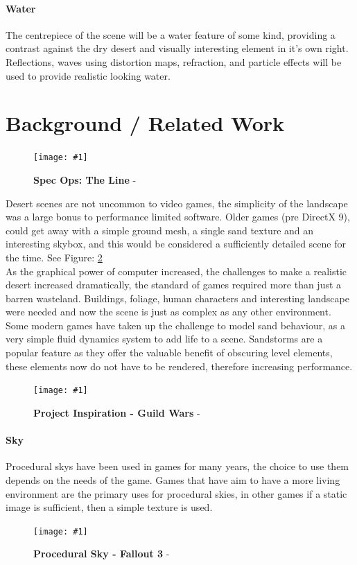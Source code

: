 \documentclass[conference]{acmsiggraph}
\newcommand{\figuremacroW}[4]{
	\begin{figure}[h] %
		\centering
		\texttt{[image: \#1]}
		\caption[#2]{\textbf{#2} - #3}
		\label{fig:#1}
	\end{figure}
}
\begin{document}
\paragraph{Water}
The centrepiece of the scene will be a water feature of some kind, providing a contrast against the dry desert and visually interesting element in it's own right. Reflections, waves using distortion maps, refraction, and particle effects will be used to provide realistic looking water. 

\section{Background / Related Work}
\figuremacroW
{specops}
{Spec Ops: The Line}
{\protect\cite{spec}}
{1.0}
Desert scenes are not uncommon to video games, the  simplicity of the landscape was a large bonus to performance limited software.
Older games (pre DirectX 9), could get away with a simple ground mesh, a single sand texture and an interesting skybox, and this would be considered a sufficiently detailed scene for the time. See Figure: \ref{fig:GuildWars}
\\
As the graphical power of computer increased, the challenges to make a realistic desert increased dramatically, the standard of games required more than just a barren wasteland. Buildings, foliage, human characters and interesting landscape were needed and now the scene is just as complex as any other environment.
Some modern games have taken up the challenge to model sand behaviour, as a very simple fluid dynamics system to add life to a scene. Sandstorms are a popular feature as they offer the valuable benefit of obscuring level elements, these elements now do not have to be rendered, therefore increasing performance.

\figuremacroW
{GuildWars}
{Project Inspiration - Guild Wars}
{\protect\cite{GuildWars}}
{1.0}

\paragraph{Sky}
Procedural skys have been used in games for many years, the choice to use them depends on the needs of the game.  Games that have aim to have a more living environment are the primary uses for procedural skies, in other games if a static image is sufficient, then a simple texture is used.
 
\figuremacroW
{fallout3}
{Procedural Sky - Fallout 3}
{\protect\cite{fallout3}}
{1.0}
\end{document}
